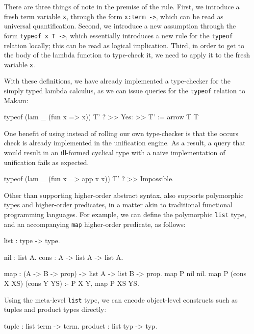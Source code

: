 \documentclass[format=acmlarge,review,anonymous]{acmart}\settopmatter{printfolios=true}
\begin{document}
There are three things of note in the premise of the rule. First, we introduce a fresh term variable
\texttt{x}, through the form \texttt{x:term ->}, which can be read as universal quantification. Second, we
introduce a new assumption through the form \texttt{typeof x T ->}, which essentially introduces a new rule
for the \texttt{typeof} relation locally; this can be read as logical implication. Third, in order to get
to the body of the lambda function to type-check it, we need to apply it to the fresh variable \texttt{x}.

With these definitions, we have already implemented a type-checker for the simply typed lambda
calculus, as we can issue queries for the \texttt{typeof} relation to Makam:

\begin{codequote}
typeof (lam _ (fun x => x)) T' ?
>> Yes:
>> T' := arrow T T
\end{codequote}

One benefit of using \lamprolog instead of rolling our own type-checker is that the occurs check is
already implemented in the unification engine. As a result, a query that would result in an
ill-formed cyclical type with a naive implementation of unification fails as expected.

\begin{codequote}
typeof (lam _ (fun x => app x x)) T' ?
>> Impossible.
\end{codequote}

Other than supporting higher-order abstract syntax, \lamprolog also supports polymorphic types and
higher-order predicates, in a matter akin to traditional functional programming languages. For
example, we can define the polymorphic \texttt{list} type, and an accompanying \texttt{map}
higher-order predicate, as follows:

\begin{codequote}
list : type -> type.

nil : list A.
cons : A -> list A -> list A.

map : (A -> B -> prop) -> list A -> list B -> prop.
map P nil nil.
map P (cons X XS) (cons Y YS) :- P X Y, map P XS YS.
\end{codequote}

Using the meta-level \texttt{list} type, we can encode object-level constructs such as tuples and product
types directly:

\begin{codequote}
tuple : list term -> term.
product : list typ -> typ.
\end{codequote}
\end{document}
